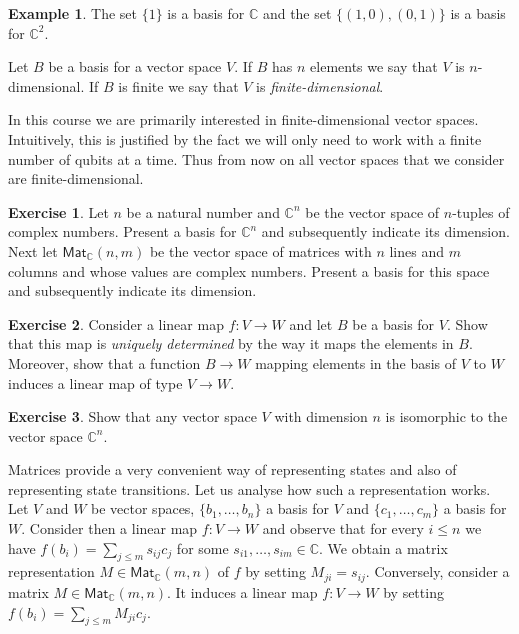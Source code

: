 \documentclass[a4paper, 11pt]{article}
\newcommand{\complex}{\mathbb{C}}
\theoremstyle{definition}
\newtheorem{examples}{Example}
\newtheorem{exercise}{Exercise}
\begin{document}
\begin{examples}
  The set $\{ 1 \}$ is a basis for $\complex$  and the set
  $\{(1,0),(0,1)\}$ is a basis for $\complex^2$.
\end{examples}

Let $B$ be a basis for a vector space $V$. If $B$ has $n$ elements we
say that $V$ is $n$-dimensional. If $B$ is finite we say that $V$ is
\emph{finite-dimensional}.

In this course we are primarily interested in finite-dimensional
vector spaces. Intuitively, this is justified by the fact we will only
need to work with a finite number of qubits at a time. Thus from now
on all vector spaces that we consider are finite-dimensional.


\begin{exercise}
  Let $n$ be a natural number and $\complex^n$ be the vector space of
  $n$-tuples of complex numbers. Present a basis for $\complex^n$ and
  subsequently indicate its dimension. Next let
  $\mathsf{Mat}_\complex(n,m)$ be the vector space of matrices with
  $n$ lines and $m$ columns and whose values are complex
  numbers. Present a basis for this space and subsequently indicate
  its dimension.
\end{exercise}


\begin{exercise}
  Consider a linear map $f : V \to W$ and let $B$ be a basis for
  $V$. Show that this map is \emph{uniquely determined} by the way it
  maps the elements in $B$. Moreover, show that a function $B \to W$
  mapping elements in the basis of $V$ to $W$ induces a linear map of
  type $V \to W$.
\end{exercise}


\begin{exercise}
  \label{ex:skele}
  Show that any vector space $V$ with dimension $n$ is isomorphic to
  the vector space $\complex^n$.
\end{exercise}

Matrices provide a very convenient way of representing states and also
of representing state transitions. Let us analyse how such a
representation works.  Let $V$ and $W$ be vector spaces,
$\{b_1,\dots,b_n\}$ a basis for $V$ and $\{c_1,\dots,c_m\}$ a basis
for $W$. Consider then a linear map $f : V \to W$ and observe that for
every $i \leq n$ we have $f(b_i) = \sum_{j \leq m} s_{ij} c_j$ for
some $s_{i1}, \dots, s_{im} \in \complex$. We obtain a matrix
representation $M \in \mathsf{Mat}_\complex(m,n)$ of $f$ by setting
$M_{ji} = s_{ij}$.  Conversely, consider a matrix
$M \in \mathsf{Mat}_\complex(m,n)$. It induces a linear map
$f : V \to W$ by setting $f(b_i) = \sum_{j \leq m} M_{ji} c_j$.
\end{document}
